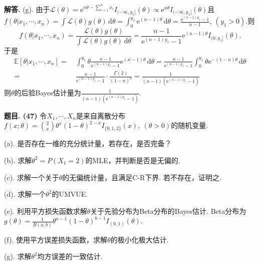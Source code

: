\documentclass[12pt, a4paper, oneside]{ctexart}
\newcounter{problem}  %
\newenvironment{problem}[1][]{\stepcounter{problem}\par\noindent\textbf{题目\arabic{problem}. #1}}{\smallskip\par}
\newenvironment{solution}[1][]{\par\noindent\textbf{#1解答. }}{\smallskip\par}  %
\def\E{\mathbb{E}}          %
\def\d{\mathrm{d}}          %
\def\e{\mathrm{e}}          %
\def\L{\mathcal{L}}         %
\begin{document}
\begin{solution}
    (g). 由于$\L(\theta) = \e^{n\theta-\sum_{i=1}^nx_i}I_{(-\infty, y_1]}(\theta)\propto \e^{n\theta}I_{(-\infty,y_1]}(\theta)$且$f(\theta|x_1,\cdots, x_n) = \int \L(\theta)g(\theta)\,\d\theta = \int_0^{y_1}\e^{(n-1)\theta}\,\d\theta = \frac{\e^{(n-1)y_1}-1}{n-1},\ (y_1>0)$.则
    \begin{equation*}
        f(\theta|x_1,\cdots,x_n) = \frac{\L(\theta)g(\theta)}{\int \L(\theta)g(\theta)\,\d\theta} = \frac{n-1}{\e^{(n-1)y_1}-1}\e^{(n-1)\theta}I_{(0,y_1]}(\theta).
    \end{equation*}
    于是
    \begin{align*}
        \E\left[\theta|x_1,\cdots,x_n\right] =&\ \int_0^{y_1}\theta\frac{n-1}{\e^{(n-1)y_1}-1}\e^{(n-1)\theta}\,\d\theta = \frac{n-1}{\e^{(n-1)y_1}-1}\int_0^{y_1}\theta\e^{-(1-n)\theta}\,\d\theta\\
        =&\ \frac{n-1}{\e^{(n-1)y_1}-1}\cdot\frac{\Gamma(2)}{(1-n)^2} = \frac{1}{(n-1)(\e^{(n-1)y_1}-1)}
    \end{align*}
    则$\theta$的后验Bayes估计量为$\frac{1}{(n-1)(\e^{(n-1)y_1}-1)}$.
\end{solution}
\begin{problem}[(47)]
    令$X_1,\cdots,X_n$是来自离散分布$f(x;\theta) = \binom{2}{x}\theta^x(1-\theta)^{2-x}I_{\{0,1,2\}}(x),\ (\theta > 0)$的随机变量.

    (a). 是否存在一维的充分统计量，若存在，是否完备？

    (b). 求解$\theta^2 = P(X_1=2)$的MLE，并判断是否是无偏的.

    (c). 求解一个关于$\theta$的无偏统计量，且满足C-R下界. 若不存在，证明之.

    (d). 求解一个$\theta^2$的UMVUE.

    (e). 利用平方损失函数求解$\theta$关于先验分布为Beta分布的Bayes估计. Beta分布为$g(\theta) = \frac{1}{B(a,b)}\theta^{a-1}(1-\theta)^{b-1}I_{(0,1)}(\theta)$.

    (f). 使用平方误差损失函数，求解$\theta$的极小化极大估计.

    (g). 求解$\theta^2$均方误差的一致估计.
\end{problem}
\end{document}
